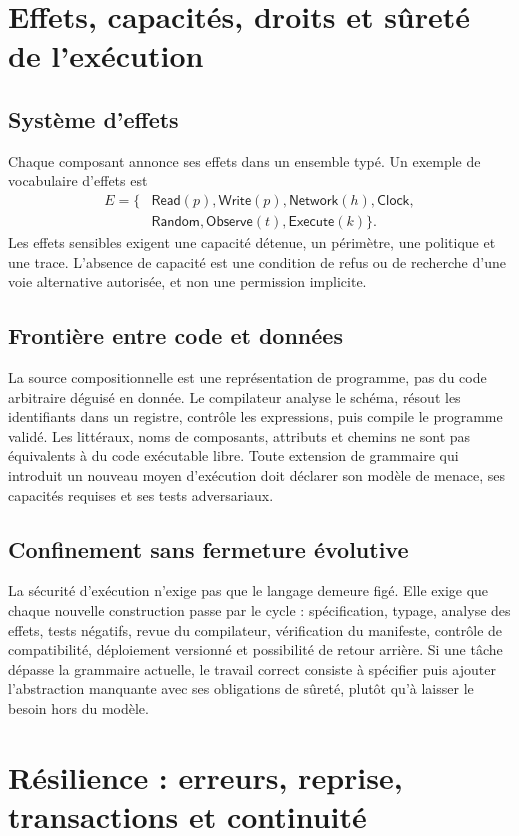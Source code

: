 \documentclass[11pt,a4paper]{article}
\theoremstyle{definition}
\theoremstyle{plain}
\theoremstyle{remark}
\begin{document}
\section{Effets, capacités, droits et sûreté de l'exécution}
\subsection{Système d'effets}
Chaque composant annonce ses effets dans un ensemble typé. Un exemple de vocabulaire d'effets est
\[
\begin{aligned}
E=\{&\mathsf{Read}(p),\mathsf{Write}(p),\mathsf{Network}(h),\mathsf{Clock},\\
&\mathsf{Random},\mathsf{Observe}(t),\mathsf{Execute}(k)\}.
\end{aligned}
\]
Les effets sensibles exigent une capacité détenue, un périmètre, une politique et une trace. L'absence de capacité est une condition de refus ou de recherche d'une voie alternative autorisée, et non une permission implicite.

\subsection{Frontière entre code et données}
La source compositionnelle est une représentation de programme, pas du code arbitraire déguisé en donnée. Le compilateur analyse le schéma, résout les identifiants dans un registre, contrôle les expressions, puis compile le programme validé. Les littéraux, noms de composants, attributs et chemins ne sont pas équivalents à du code exécutable libre. Toute extension de grammaire qui introduit un nouveau moyen d'exécution doit déclarer son modèle de menace, ses capacités requises et ses tests adversariaux.

\subsection{Confinement sans fermeture évolutive}
La sécurité d'exécution n'exige pas que le langage demeure figé. Elle exige que chaque nouvelle construction passe par le cycle : spécification, typage, analyse des effets, tests négatifs, revue du compilateur, vérification du manifeste, contrôle de compatibilité, déploiement versionné et possibilité de retour arrière. Si une tâche dépasse la grammaire actuelle, le travail correct consiste à spécifier puis ajouter l'abstraction manquante avec ses obligations de sûreté, plutôt qu'à laisser le besoin hors du modèle.

\section{Résilience : erreurs, reprise, transactions et continuité}
\end{document}
